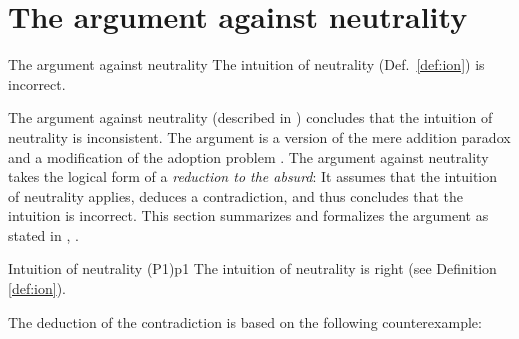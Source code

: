 \section{The argument against neutrality}
\label{sec:arg}

\begin{Theorem}{The argument against neutrality}{}
The intuition of neutrality (Def.~\ref{def:ion}) is incorrect.
\end{Theorem}

The argument against neutrality (described in ) concludes that the intuition of neutrality is inconsistent. The argument is a version of the mere addition paradox \cite[p.~148]{broome_2004} and a modification of the adoption problem \cite[p.~161]{broome_2004}. The argument against neutrality takes the logical form of a \emph{reduction to the absurd}: It assumes that the intuition of neutrality applies, deduces a contradiction, and thus concludes that the intuition is incorrect. This section summarizes and formalizes the argument as stated in , . 

\begin{Premise}{Intuition of neutrality (P1)}{p1}
The intuition of neutrality is right (see Definition \ref{def:ion}).
\end{Premise}

The deduction of the contradiction is based on the following counterexample: 

